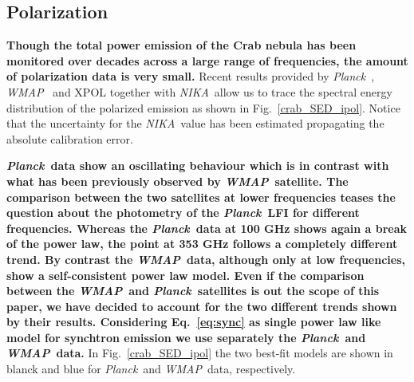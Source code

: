 \documentclass[twocolumn,traditabstract]{aa}
\def\NIKA{\textit{NIKA}}
\def\Planck{\textit{Planck}}
\def\WMAP{\textit{WMAP}}
\begin{document}
\subsection{Polarization}
\textbf{Though the total power emission of the Crab nebula has been monitored over decades across a large range of frequencies, the amount of polarization data is
very small.}
Recent results provided by
\Planck\ \citep{2015arXiv150702058P}, \WMAP\ \citep{2011ApJS..192...19W} and
XPOL \citep{aumont2010} together with \NIKA\ allow us to trace the spectral energy distribution of the polarized emission as shown in Fig.~\ref{crab_SED_ipol}.  
Notice that the uncertainty for the \NIKA\ value has been estimated propagating the absolute calibration error.  

\textbf{\Planck\ data show an oscillating behaviour which is in contrast with what has been previously observed by \WMAP\ satellite.
The comparison between the two satellites at lower frequencies teases the question about the photometry of the \Planck\ LFI for different frequencies.
Whereas the \Planck\ data at 100 GHz shows again a break of the power law, the point at 353 GHz follows a completely different trend.
By contrast the \WMAP\ data, although only at low frequencies, show a self-consistent power law model.
Even if the comparison between the \WMAP\ and \Planck\ satellites is out the scope of this paper, we have decided to account for the two different trends shown by their results. Considering Eq.~\ref{eq:sync} as single power law like model for synchtron emission we use separately the \Planck\ and \WMAP\ data.}
In Fig.~\ref{crab_SED_ipol} the two best-fit models are shown in blanck and blue for \Planck\ and \WMAP\ data, respectively.
 
\end{document}
